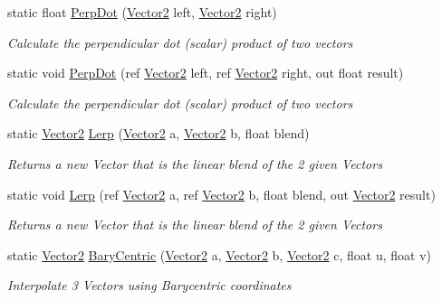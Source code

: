 \begin{DoxyCompactItemize}
static float \hyperlink{struct_open_t_k_1_1_vector2_ab58d4bc7b965ef49492851a7765a1102}{Perp\-Dot} (\hyperlink{struct_open_t_k_1_1_vector2}{Vector2} left, \hyperlink{struct_open_t_k_1_1_vector2}{Vector2} right)
\begin{DoxyCompactList}\small\item\em Calculate the perpendicular dot (scalar) product of two vectors \end{DoxyCompactList}\item 
static void \hyperlink{struct_open_t_k_1_1_vector2_acc1cd930d7fc6e7fd24d4adf2a7db9a1}{Perp\-Dot} (ref \hyperlink{struct_open_t_k_1_1_vector2}{Vector2} left, ref \hyperlink{struct_open_t_k_1_1_vector2}{Vector2} right, out float result)
\begin{DoxyCompactList}\small\item\em Calculate the perpendicular dot (scalar) product of two vectors \end{DoxyCompactList}\item 
static \hyperlink{struct_open_t_k_1_1_vector2}{Vector2} \hyperlink{struct_open_t_k_1_1_vector2_acb29fc54e0d91253630b3ae6d4e84d18}{Lerp} (\hyperlink{struct_open_t_k_1_1_vector2}{Vector2} a, \hyperlink{struct_open_t_k_1_1_vector2}{Vector2} b, float blend)
\begin{DoxyCompactList}\small\item\em Returns a new Vector that is the linear blend of the 2 given Vectors \end{DoxyCompactList}\item 
static void \hyperlink{struct_open_t_k_1_1_vector2_a3ec68780bd3702bf865327d817e8b5ca}{Lerp} (ref \hyperlink{struct_open_t_k_1_1_vector2}{Vector2} a, ref \hyperlink{struct_open_t_k_1_1_vector2}{Vector2} b, float blend, out \hyperlink{struct_open_t_k_1_1_vector2}{Vector2} result)
\begin{DoxyCompactList}\small\item\em Returns a new Vector that is the linear blend of the 2 given Vectors \end{DoxyCompactList}\item 
static \hyperlink{struct_open_t_k_1_1_vector2}{Vector2} \hyperlink{struct_open_t_k_1_1_vector2_aea19a8a241074d896cebc693150cdf8a}{Bary\-Centric} (\hyperlink{struct_open_t_k_1_1_vector2}{Vector2} a, \hyperlink{struct_open_t_k_1_1_vector2}{Vector2} b, \hyperlink{struct_open_t_k_1_1_vector2}{Vector2} c, float u, float v)
\begin{DoxyCompactList}\small\item\em Interpolate 3 Vectors using Barycentric coordinates \end{DoxyCompactList}\item 

\end{DoxyCompactItemize}
